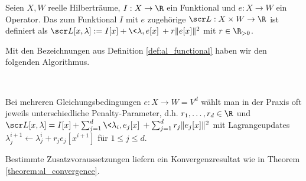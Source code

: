 \documentclass{mythesis}
\begin{document}
\begin{definition} \label{def:al_functional}
    Seien $X, W$ reelle Hilberträume, $I: X \to \R$ ein Funktional und $e: X \to W$ ein Operator.
    Das zum Funktional $I$ mit  $e$ zugehörige  $\scr L: X \times W \to \R$
    ist definiert als
    \begin{math}
	\scr L[x,\lambda] := I[x] + \<\lambda, e[x]\> + r \|e[x]\|^2
    \end{math}
    mit  $r \in \R_{>0}$.
\end{definition}


\begin{algorithm} \label{alg:al}
    Mit den Bezeichnungen aus Definition \ref{def:al_functional} haben wir den folgenden Algorithmus.

    \begin{samepage}
	\\
	\begin{algorithmic}
	    \EndFor
	\end{algorithmic}
    \end{samepage}
    \begin{note}
	Bei mehreren Gleichungsbedingungen $e: X \to W = V^d$ wählt man in der Praxis oft jeweils unterschiedliche Penalty-Parameter, d.h. $r_1, \dotsc, r_d \in \R$ und
	\begin{math}
	    \scr L[x, \lambda] = I[x] + \sum_{j=1}^d \<\lambda_i, e_j[x]\> + \sum_{j=1}^d r_j \|e_j[x]\|^2
	\end{math}
	mit Lagrangeupdates $\lambda^{i+1}_j \gets \lambda^i_j + r_j e_j[x^{i+1}]$ für $1 \le j \le d$.
    \end{note}
\end{algorithm}

Bestimmte Zusatzvoraussetzungen liefern ein Konvergenzresultat wie in Theorem \ref{theorem:al_convergence}.
\end{document}

